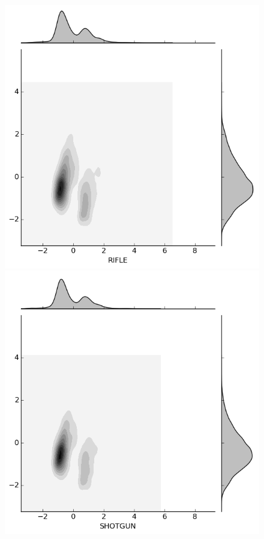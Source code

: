 \begin{figure}[H]
\begin{minipage}[b]{0.20\linewidth}
  \end{minipage}
  \quad
  \begin{minipage}[b]{0.20\linewidth}
    \includegraphics[width=\linewidth]{images/weapon/RIFLE.png}
  \end{minipage}
  \quad
  \begin{minipage}[b]{0.20\linewidth}
    \includegraphics[width=\linewidth]{images/weapon/SHOTGUN.png}
  \end{minipage}


\end{figure}
